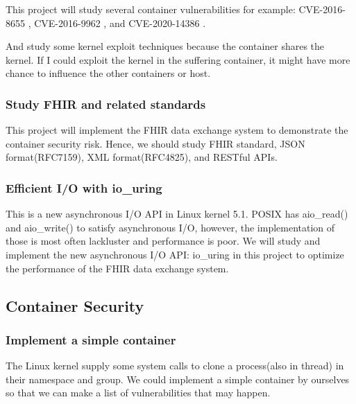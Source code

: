 \documentclass[12pt,a4paper]{article}
\begin{document}
This project will study several container vulnerabilities for example: CVE-2016-8655
\cite{CVE-2016-8655}, CVE-2016-9962 \cite{CVE-2016-9962}, and CVE-2020-14386 \cite{CVE-2020-14386}.

And study some kernel exploit techniques \cite{Kernel_exploitation} because the container shares
the kernel. If I could exploit the kernel in the suffering container, it might have more chance
to influence the other containers or host.

\subsubsection{Study FHIR and related standards}
This project will implement the FHIR \cite{FHIR_home} data exchange system to demonstrate the container
security risk. Hence, we should study FHIR standard, JSON format(RFC7159), XML format(RFC4825), and
RESTful APIs.

\subsubsection{Efficient I/O with io\_uring} \cite{Efficient_IO_uring}
This is a new asynchronous I/O API in Linux kernel 5.1. POSIX has aio\_read() and aio\_write() to
satisfy asynchronous I/O, however, the implementation of those is most often lackluster and performance
is poor. We will study and implement the new asynchronous I/O API: io\_uring in this project to
optimize the performance of the FHIR data exchange system.

\subsection{Container Security}
\subsubsection{Implement a simple container}
The Linux kernel supply some system calls to clone a process(also in thread) in their namespace
and group. We could implement a simple container by ourselves so that we can make a list of
vulnerabilities that may happen.
\UseRawInputEncoding
\end{document}
